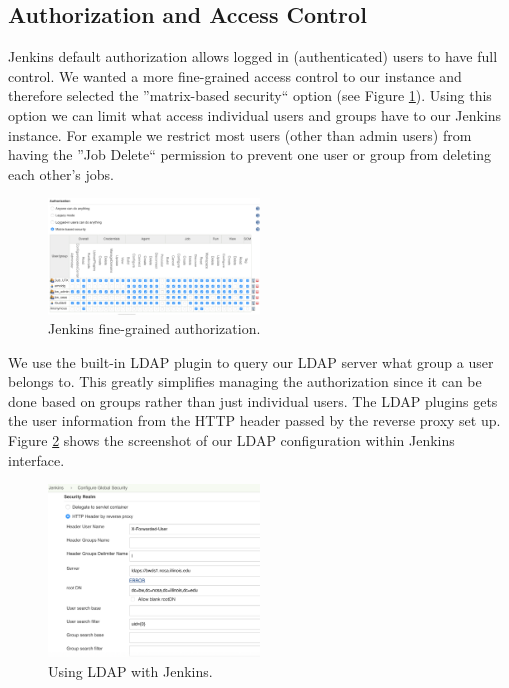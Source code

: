 \documentclass[AMA]{WileyNJD-v1}
\begin{document}
\subsection{Authorization and Access Control}
\label{subsec:authorization}

Jenkins default authorization allows logged in (authenticated) users to have full control. 
We wanted a more fine-grained access control to our instance and therefore selected the ''matrix-based security`` option (see Figure \ref{fig:jenkinsAuthorization}). Using this option we can limit what access individual users and groups have to our Jenkins instance. 
For example we restrict most users (other than admin users) from having the ''Job Delete`` permission to prevent one user or group from deleting each other's jobs. 

\begin{figure}[h]
\centering
\includegraphics[width=0.5\textwidth]{Configure-Global-Security}
\caption{Jenkins fine-grained authorization.}
\label{fig:jenkinsAuthorization}
\end{figure}

We use the built-in LDAP plugin to query our LDAP server what group a user belongs to.
This greatly simplifies managing the authorization since it can be done based on groups rather than just individual users. 
The LDAP plugins gets the user information from the HTTP header passed by the reverse proxy set up. 
Figure \ref{fig:LDAP-Jenkins} shows the screenshot of our LDAP configuration within Jenkins interface.

\begin{figure}
\centering
\includegraphics[width=0.5\textwidth]{LDAP-Jenkins}
\caption{Using LDAP with Jenkins.}
\label{fig:LDAP-Jenkins}
\end{figure}
\end{document}
